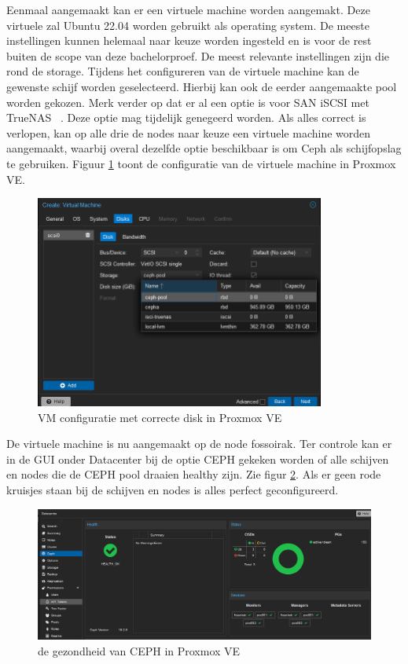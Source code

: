 Eenmaal aangemaakt kan er een virtuele machine worden aangemakt. Deze virtuele zal Ubuntu 22.04 worden gebruikt als operating system.
De meeste instellingen kunnen helemaal naar keuze worden ingesteld en is voor de rest buiten de scope van deze bachelorproef. De meest relevante instellingen zijn die rond de storage.
Tijdens het configureren van de virtuele machine kan de gewenste schijf worden geselecteerd. Hierbij kan ook de eerder aangemaakte pool worden gekozen.
Merk verder op dat er al een optie is voor SAN iSCSI met TrueNAS~\autocite{truenas} . Deze optie mag tijdelijk genegeerd worden.
Als alles correct is verlopen, kan op alle drie de nodes naar keuze een virtuele machine worden aangemaakt, waarbij overal dezelfde optie beschikbaar is om Ceph als schijfopslag te gebruiken.
Figuur \ref{fig:vm-storage-proxmox} toont de configuratie van de virtuele machine in Proxmox VE.
\begin{figure}[H]
  \centering
  \includegraphics[width=0.85\textwidth]{../poc/vm-storage-prox.png}
  \caption{VM configuratie met correcte disk in Proxmox VE}
  \label{fig:vm-storage-proxmox}
\end{figure}

De virtuele machine is nu aangemaakt op de node fossoirak.
Ter controle kan er in de GUI onder Datacenter bij de optie CEPH gekeken worden of alle schijven en nodes die de CEPH pool draaien healthy zijn. Zie figur \ref{fig:ceph-healthy-prox}.
Als er geen rode kruisjes staan bij de schijven en nodes is alles perfect geconfigureerd.
\begin{figure}[H]
  \centering
  \includegraphics[width=1.1\textwidth]{../poc/ceph-healthy-prox.png}
  \caption{de gezondheid van CEPH  in Proxmox VE}
  \label{fig:ceph-healthy-prox}
\end{figure}

